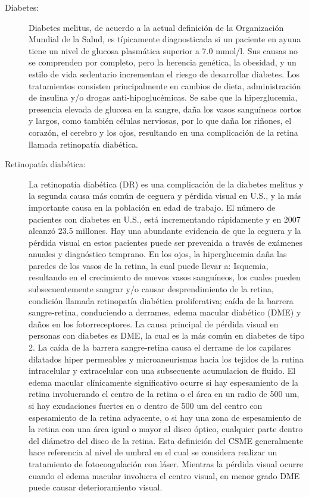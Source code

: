 \begin{description}
    \item[Diabetes:] Diabetes melitus, de acuerdo a la actual definición de la Organización Mundial de la Salud, es típicamente diagnosticada si un paciente en ayuna tiene un nivel de glucosa plasmática superior a 7.0 mmol/l. Sus causas no se comprenden por completo, pero la herencia genética, la obesidad, y un estilo de vida sedentario incrementan el riesgo de desarrollar diabetes. Los tratamientos consisten principalmente en cambios de dieta, administración de insulina y/o drogas anti-hipoglucémicas. Se sabe que la hiperglucemia, presencia elevada de glucosa en la sangre, daña los vasos sanguíneos cortos y largos, como también células nerviosas, por lo que daña los riñones, el corazón, el cerebro y los ojos, resultando en una complicación de la retina llamada retinopatía diabética.
    \item[Retinopatía diabética:] La retinopatía diabética (DR) es una complicación de la diabetes melitus y la segunda causa más común de ceguera y pérdida visual en U.S., y la más importante causa en la población en edad de trabajo. El número de pacientes con diabetes en U.S., está incrementando rápidamente y en 2007 alcanzó 23.5 millones. Hay una abundante evidencia de que la ceguera y la pérdida visual en estos pacientes puede ser prevenida a través de exámenes anuales y  diagnóstico temprano. En los ojos, la hiperglucemia daña las paredes de los vasos de la retina, la cual puede llevar a:
Isquemia, resultando en el crecimiento de nuevos vasos sanguíneos, los cuales pueden subsecuentemente sangrar y/o causar desprendimiento de la retina, condición llamada retinopatía diabética proliferativa;
caída de la barrera sangre-retina, conduciendo a derrames, edema macular diabético (DME) y daños en los fotorreceptores.
La causa principal de pérdida visual en personas con diabetes es DME, la cual es la más común en diabetes de tipo 2. La caída de la barrera sangre-retina causa el derrame de los capilares dilatados hiper permeables y microaneurismas hacia los tejidos de la rutina intracelular y extracelular con una subsecuente acumulacion de fluido. El edema macular clínicamente significativo ocurre si hay espesamiento de la retina involucrando el centro de la retina o el área en un radio de 500 um, si hay exudaciones fuertes en o dentro de 500 um del centro con espesamiento de la retina adyacente, o si hay una zona de espesamiento de la retina con una área igual o mayor al disco óptico, cualquier parte dentro del diámetro del disco de la retina. Esta definición del CSME generalmente hace referencia al nivel de umbral en el cual se considera realizar un tratamiento de fotocoagulación con láser. Mientras la pérdida visual ocurre cuando el edema macular involucra el centro visual, en menor grado DME puede causar deterioramiento visual.

\end{description}
